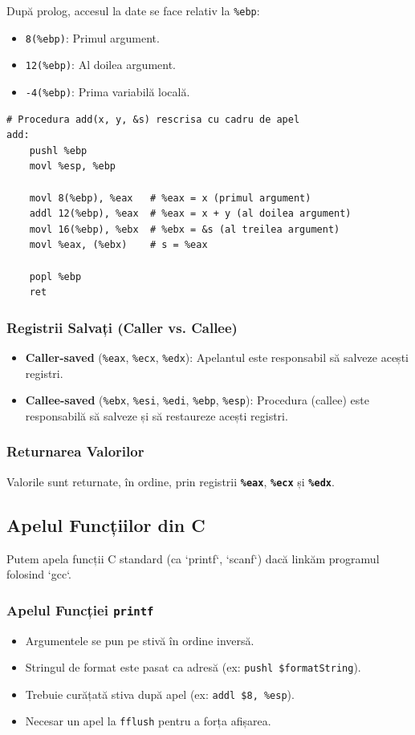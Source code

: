 \documentclass[12pt,a4paper]{article}
\begin{document}
După prolog, accesul la date se face relativ la \texttt{\%ebp}:
\begin{itemize}
    \item \texttt{8(\%ebp)}: Primul argument.
    \item \texttt{12(\%ebp)}: Al doilea argument.
    \item \texttt{-4(\%ebp)}: Prima variabilă locală.
\end{itemize}

\begin{lstlisting}[language=x86asm]
# Procedura add(x, y, &s) rescrisa cu cadru de apel
add:
    pushl %ebp
    movl %esp, %ebp
    
    movl 8(%ebp), %eax   # %eax = x (primul argument)
    addl 12(%ebp), %eax  # %eax = x + y (al doilea argument)
    movl 16(%ebp), %ebx  # %ebx = &s (al treilea argument)
    movl %eax, (%ebx)    # s = %eax
    
    popl %ebp
    ret
\end{lstlisting}

\subsubsection{Registrii Salvați (Caller vs. Callee)}
\begin{itemize}
    \item \textbf{Caller-saved} (\texttt{\%eax}, \texttt{\%ecx}, \texttt{\%edx}): Apelantul este responsabil să salveze acești registri.
    \item \textbf{Callee-saved} (\texttt{\%ebx}, \texttt{\%esi}, \texttt{\%edi}, \texttt{\%ebp}, \texttt{\%esp}): Procedura (callee) este responsabilă să salveze și să restaureze acești registri.
\end{itemize}

\subsubsection{Returnarea Valorilor}
Valorile sunt returnate, în ordine, prin registrii \textbf{\texttt{\%eax}}, \textbf{\texttt{\%ecx}} și \textbf{\texttt{\%edx}}.

\subsection{Apelul Funcțiilor din C}
Putem apela funcții C standard (ca `printf`, `scanf`) dacă linkăm programul folosind `gcc`.

\subsubsection{Apelul Funcției \texttt{printf}}
\begin{itemize}
    \item Argumentele se pun pe stivă în ordine inversă.
    \item Stringul de format este pasat ca adresă (ex: \texttt{pushl \$formatString}).
    \item Trebuie curățată stiva după apel (ex: \texttt{addl \$8, \%esp}).
    \item Necesar un apel la \texttt{fflush} pentru a forța afișarea.
\end{itemize}
\end{document}
